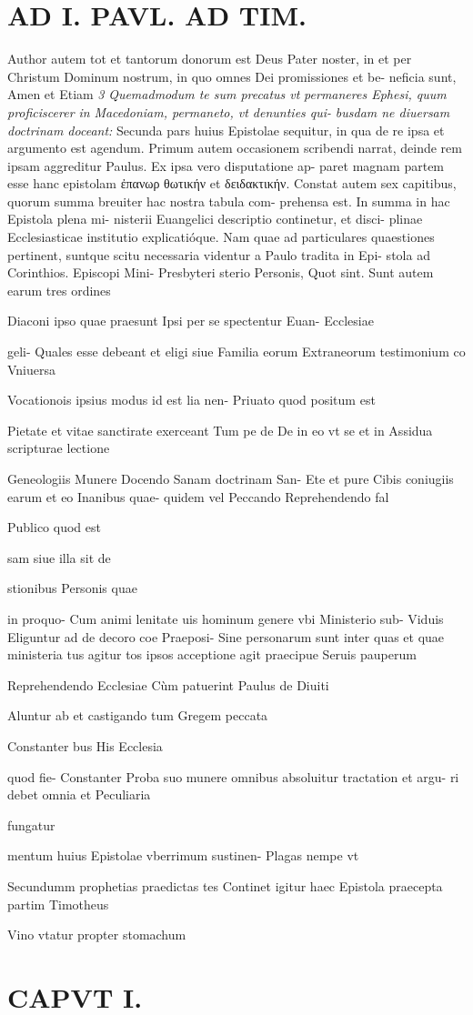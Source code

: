 \documentclass{article}
\begin{document}
\begin{pages}
\section*{AD I. PAVL. AD TIM. }Author autem tot et tantorum donorum est Deus Pater noster, in et per Christum Dominum nostrum, in quo omnes Dei promissiones et be- neficia sunt, Amen et Etiam \textit{3} \textit{Quemadmodum te sum precatus vt} \textit{permaneres Ephesi, quum proficiscerer in} \textit{Macedoniam, permaneto, vt denunties qui-} \textit{busdam ne diuersam doctrinam doceant:} Secunda pars huius Epistolae sequitur, in qua de re ipsa et argumento est agendum. Primum autem occasionem scribendi narrat, deinde rem ipsam aggreditur Paulus. Ex ipsa vero disputatione ap- paret magnam partem esse hanc epistolam ἐπανωρ θωτικήν et δειδακτικήν. Constat autem sex capitibus, quorum summa breuiter hac nostra tabula com- prehensa est. In summa in hac Epistola plena mi- nisterii Euangelici descriptio continetur, et disci- plinae Ecclesiasticae institutio explicatióque. Nam quae ad particulares quaestiones pertinent, suntque scitu necessaria videntur a Paulo tradita in Epi- stola ad Corinthios. 
\marginpar{[ p.7 ]}Episcopi Mini- Presbyteri sterio Personis, Quot sint. Sunt autem earum tres ordines { Diaconi ipso quae praesunt Ipsi per se spectentur Euan- Ecclesiae { geli- Quales esse debeant et eligi siue Familia eorum Extraneorum testimonium co Vniuersa { Vocationois ipsius modus id est lia nen- Priuato quod positum est { Pietate et vitae sanctirate exerceant Tum pe de De in eo vt se et in Assidua scripturae lectione { Geneologiis Munere Docendo Sanam doctrinam San- Ete et pure Cibis coniugiis earum et eo Inanibus quae- quidem vel Peccando Reprehendendo fal { Publico quod est { sam siue illa sit de { stionibus Personis quae { in proquo- Cum animi lenitate uis hominum genere vbi Ministerio sub- Viduis Eliguntur ad de decoro coe Praeposi- Sine personarum sunt inter quas et quae ministeria tus agitur tos ipsos acceptione agit praecipue Seruis pauperum { { Reprehendendo Ecclesiae Cùm patuerint Paulus de Diuiti { Aluntur ab et castigando tum Gregem peccata { Constanter bus His Ecclesia { quod fie- Constanter Proba suo munere omnibus absoluitur tractation et argu- ri debet omnia et Peculiaria { fungatur { mentum huius Epistolae vberrimum sustinen- Plagas nempe vt { Secundumm prophetias praedictas tes Continet igitur haec Epistola praecepta partim Timotheus { Vino vtatur propter stomachum { 
\section*{CAPVT I. }
\marginpar{[ p.8 ]}
}}}}}}}}}}}}}}}}}}}
\end{pages}
\end{document}
